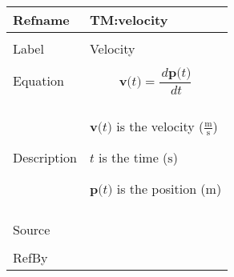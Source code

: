 \documentclass[12pt]{article}
\begin{document}
\begin{minipage}{\textwidth}
\begin{tabular}{>{\raggedright}p{}>{\raggedright\arraybackslash}p{}}
\toprule \textbf{Refname} & \textbf{TM:velocity}
\label{TM:velocity}
\\ \midrule \\
Label & Velocity
        
\\ \midrule \\
Equation & \begin{displaymath}
           \symbf{v}\text{(}t\text{)}=\frac{\,d\symbf{p}\text{(}t\text{)}}{\,dt}
           \end{displaymath}
\\ \midrule \\
Description & \begin{symbDescription}
              \item{$\symbf{v}\text{(}t\text{)}$ is the velocity ($\frac{\text{m}}{\text{s}}$)}
              \item{$t$ is the time (${\text{s}}$)}
              \item{$\symbf{p}\text{(}t\text{)}$ is the position (${\text{m}}$)}
              \end{symbDescription}
\\ \midrule \\
Source & \cite{velocityWiki}
         
\\ \midrule \\
RefBy & 
\\ \bottomrule
\end{tabular}
\end{minipage}
\vspace{\baselineskip}
\noindent
\end{document}
